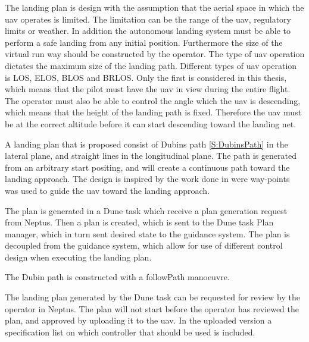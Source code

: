 The landing plan is design with the assumption that the aerial space in which the uav operates is limited. The limitation can be the range of the uav, regulatory limits or weather. In addition the autonomous landing system must be able to perform a safe landing from any initial position. Furthermore the size of the virtual run way should be constructed by the operator. The type of uav operation dictates the maximum size of the landing path. Different types of uav operation is LOS, ELOS, BLOS and BRLOS. Only the first is considered in this thesis, which means that the pilot must have the uav in view during the entire flight. The operator must also be able to control the angle which the uav is descending, which means that the height of the landing path is fixed. Therefore the uav must be at the correct altitude before it can start descending toward the landing net.

A landing plan that is proposed consist of Dubins path \ref{S:DubinsPath} in the lateral plane, and straight lines in the longitudinal plane. The path is generated from an arbitrary start positing, and will create a continuous path toward the landing approach. The design is inspired by the work done in \citep{Skulstad&Syversen} were way-points was used to guide the uav toward the landing approach.

The plan is generated in a Dune task which receive a plan generation request from Neptus. Then a plan is created, which is sent to the Dune task Plan manager, which in turn sent desired state to the guidance system. The plan is decoupled from the guidance system, which allow for use of different control design when executing the landing plan.

The Dubin path is constructed with a followPath manoeuvre.

The landing plan generated by the Dune task can be requested for review by the operator in Neptus. The plan will not start before the operator has reviewed the plan, and approved by uploading it to the uav. In the uploaded version a specification list on which controller that should be used is included.  
